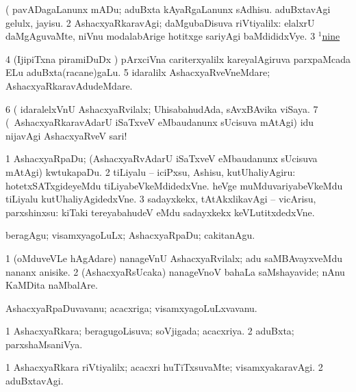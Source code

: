 \noindent
\gl{\pagu}
\expl{}
\bmng
\bnum
{}  (  
\banum
{} pavADagaLanunx mADu; aduBxta kAyaRgaLanunx sAdhisu. 
 aduBxtavAgi gelulx, jayisu. 
\eanum
\numie
\num{2}  AshacxyaRkaravAgi; daMgubaDisuva riVtiyalilx:  elalxrU daMgAguvaMte, niVnu modalabArige hotitxge sariyAgi baMdididxVye. 
\num{3} \hyperref{kandict_n.pdf}{N}{nine(1) pagu(3)}{$^1$nine}  
\num{4}  (IjipiTxna piramiDuDx \mo) pArxciVna cariterxyalilx kareyalAgiruva parxpaMcada ELu aduBxta(racane)gaLu. 
\num{5}  idaralilx AshacxyaRveVneMdare; AshacxyaRkaravAdudeMdare. 
\num{6}  (  idaralelxVnU AshacxyaRvilalx; UhisabahudAda, sAvxBAvika viSaya. 
\num{7}  (\sA\ AshacxyaRkaravAdarU iSaTxveV eMbaudanunx sUcisuva mAtAgi) idu nijavAgi AshacxyaRveV sari! 
\enum
\emng
\eentry

\bentry
{} 
\gl{\sakirx}
\expl{}
\bmng
\bnum
\num{1} AshacxyaRpaDu; (AshacxyaRvAdarU iSaTxveV eMbaudanunx sUcisuva mAtAgi) kwtukapaDu. 
\num{2} tiLiyalu -- iciPxsu, Ashisu, kutUhaliyAgiru:  hotetxSATxgideyeMdu tiLiyabeVkeMdidedxVne.  heVge muMduvariyabeVkeMdu tiLiyalu kutUhaliyAgidedxVne. 
\num{3} sadayxkekx, tAtAkxlikavAgi -- vicArisu, parxshinxsu:  kiTaki tereyabahudeV eMdu sadayxkekx keVLutitxdedxVne. 
\enum
\emng

\noindent 
\gl{\akirx}
\expl{}
\bmng
beragAgu; visamxyagoLuLx; AshacxyaRpaDu; cakitanAgu. 
\emng

\noindent
\gl{\pagu}
\expl{}
\bmng
\bnum
\num{1}  (oMduveVLe hAgAdare) nanageVnU AshacxyaRvilalx; adu saMBAvayxveMdu nananx anisike. 
\num{2}  (AshacxyaRsUcaka) nanageVnoV bahaLa saMshayavide; nAnu KaMDita naMbalAre. 
\enum
\emng
\eentry

\bentry
{} 
\gl{\nA}
\expl{}
\bmng
AshacxyaRpaDuvavanu; acacxriga; visamxyagoLuLxvavanu. 
\emng
\eentry

\bentry
{} 
\gl{\gu}
\expl{}
\bmng
\bnum
\num{1} AshacxyaRkara; beragugoLisuva; soVjigada; acacxriya. 
\num{2} aduBxta; parxshaMsaniVya. 
\enum
\emng
\eentry

\bentry
{} 
\gl{\kirxvi}
\expl{}
\bmng
\bnum
\num{1} AshacxyaRkara riVtiyalilx; acacxri huTiTxsuvaMte; visamxyakaravAgi. 
\num{2} aduBxtavAgi. 
\enum
\emng
\eentry

